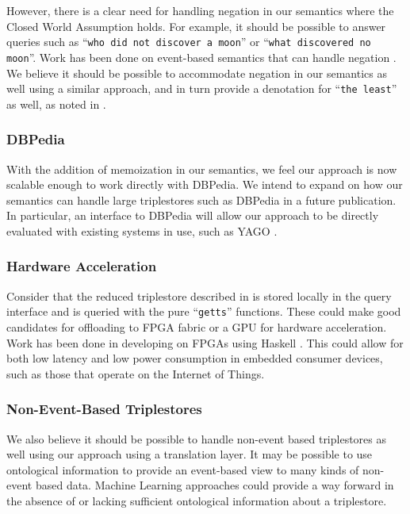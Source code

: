 \documentclass[../main.tex]{subfiles}
\begin{document}
\begin{refsection}
However, there is a clear need for handling negation in our semantics where the Closed World Assumption holds. For example, it should be possible to answer queries such as ``\texttt{who did not discover a moon}'' or ``\texttt{what discovered no moon}''.  Work has been done on event-based semantics that can handle negation \cite{champollion2015interaction}.  We believe it should be possible to accommodate negation in our semantics as well using a similar approach, and in turn provide a denotation for ``\texttt{the least}'' as well, as noted in .

\subsubsection{DBPedia}

With the addition of memoization in our semantics, we feel our approach is now scalable enough to work directly with DBPedia.  We intend to expand on how our semantics can handle large triplestores such as DBPedia in a future publication.  In particular, an interface to DBPedia will allow our approach to be directly evaluated with existing systems in use, such as YAGO \cite{hoffart2013yago2}.

\subsubsection{Hardware Acceleration}
Consider that the reduced triplestore described in  is stored locally in the query interface and is queried with the pure ``\texttt{getts}'' functions.  These could make good candidates for offloading to FPGA fabric or a GPU for hardware acceleration.
Work has been done in developing on FPGAs using Haskell \cite{baaij2009clambdaash}.
This could allow for both low latency and low power consumption in embedded consumer devices, such as those that operate on the Internet of Things.

\subsubsection{Non-Event-Based Triplestores}
We also believe it should be possible to handle non-event based triplestores as well using our approach using a translation layer.  It may be possible to use ontological information to provide an event-based view to many kinds of non-event based data.  Machine Learning approaches could provide a way forward in the absence of or lacking sufficient ontological information about a triplestore.


\end{refsection}
\end{document}
